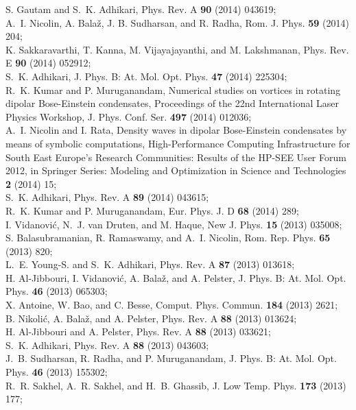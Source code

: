 \documentclass[onecolumn,3p]{elsarticle}
\begin{document}
\begin{thebibliography}{5}
S. Gautam and S.~K. Adhikari, Phys. Rev. A {\bf 90} (2014) 043619;\\
A.~I. Nicolin, A. Bala\v{z}, J. B. Sudharsan, and R. Radha, Rom. J. Phys. {\bf 59} (2014) 204;\\
K. Sakkaravarthi, T. Kanna, M. Vijayajayanthi, and M. Lakshmanan, Phys. Rev. E {\bf 90} (2014) 052912;\\
S.~K. Adhikari, J. Phys. B: At. Mol. Opt. Phys. {\bf 47} (2014) 225304;\\
R.~K. Kumar and P. Muruganandam, Numerical studies on vortices in rotating dipolar Bose-Einstein condensates, Proceedings of the 22nd International Laser Physics Workshop, J. Phys. Conf. Ser. {\bf 497} (2014) 012036;\\
A.~I. Nicolin and I. Rata, Density waves in dipolar Bose-Einstein condensates by means of symbolic computations, High-Performance Computing Infrastructure for South East Europe's Research Communities: Results of the HP-SEE User Forum 2012, in Springer Series: Modeling and Optimization in Science and Technologies {\bf 2} (2014) 15;\\
S.~K. Adhikari, Phys. Rev. A {\bf 89} (2014) 043615;\\
R.~K. Kumar and P. Muruganandam, Eur. Phys. J. D {\bf 68} (2014) 289;\\
I. Vidanovi\'{c}, N.~J. van Druten, and M. Haque, New J. Phys. {\bf 15} (2013) 035008;\\
S. Balasubramanian, R. Ramaswamy, and A.~I. Nicolin, Rom. Rep. Phys. {\bf 65} (2013) 820;\\
L.~E. Young-S. and S.~K. Adhikari, Phys. Rev. A {\bf 87} (2013) 013618;\\
H. Al-Jibbouri, I. Vidanovi\'{c}, A. Bala\v{z}, and A. Pelster, J. Phys. B: At. Mol. Opt. Phys. {\bf 46} (2013) 065303;\\
X. Antoine, W. Bao, and C. Besse, Comput. Phys. Commun. {\bf 184} (2013) 2621;\\
B. Nikoli\'{c}, A. Bala\v{z}, and A. Pelster, Phys. Rev. A {\bf 88} (2013) 013624;\\
H. Al-Jibbouri and A. Pelster, Phys. Rev. A {\bf 88} (2013) 033621;\\
S.~K. Adhikari, Phys. Rev. A {\bf 88} (2013) 043603;\\
J.~B. Sudharsan, R. Radha, and P. Muruganandam, J. Phys. B: At. Mol. Opt. Phys. {\bf 46} (2013) 155302;\\
R.~R. Sakhel, A.~R. Sakhel, and H.~B. Ghassib, J. Low Temp. Phys. {\bf 173} (2013) 177;\\

\end{thebibliography}
\end{document}
